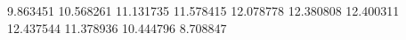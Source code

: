 9.863451
10.568261
11.131735
11.578415
12.078778
12.380808
12.400311
12.437544
11.378936
10.444796
8.708847
